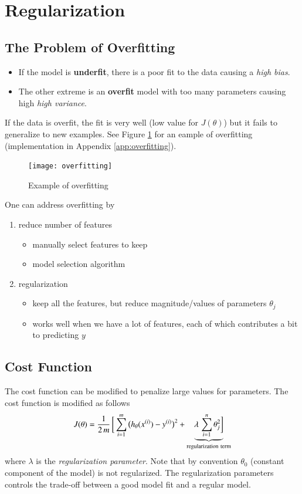 \documentclass[a4paper,twoside,10pt]{article}
\begin{document}
\section{Regularization}\label{cha:regularization}
\subsection{The Problem of Overfitting}
\begin{itemize}
  \item If the model is \textbf{underfit}, there is a poor fit to the data causing a \emph{high bias}.
  \item The other extreme is an \textbf{overfit} model with too many parameters causing high \emph{high variance}.
\end{itemize}
If the data is overfit, the fit is very well (low value for $J(\theta)$) but it fails to generalize to new examples.
See Figure \ref{fig:overfitting} for an eample of overfitting (implementation in Appendix \ref{app:overfitting}).
\begin{figure}[htbp]
  \begin{center}
    \texttt{[image: overfitting]}
    \caption{Example of overfitting\label{fig:overfitting}}
  \end{center}
\end{figure}

One can address overfitting by
\begin{enumerate}
  \item reduce number of features
    \begin{itemize}
      \item manually select features to keep
      \item model selection algorithm
    \end{itemize}
  \item regularization
    \begin{itemize}
      \item keep all the features, but reduce magnitude/values of parameters $\theta_j$
      \item works well when we have a lot of features, each of which contributes a bit to predicting $y$
    \end{itemize}
\end{enumerate}

\subsection{Cost Function}
The cost function can be modified to penalize large values for parameters.
The cost function is modified as follows
\begin{equation*}
  J(\theta)=\frac{1}{2\,m}\,\bigg[\sumi\big(h_\theta(\sxi)-\syi\big)^2+\underbrace{\lambda\,\sum_{i=1}^n\theta_j^2\bigg]}_{\mathrm{regularization\ term}}
\end{equation*}
where $\lambda$ is the \emph{regularization parameter}.
Note that by convention $\theta_0$ (constant component of the model) is not regularized.
The regularization parameters controls the trade-off between a good model fit and a regular model.
\end{document}
